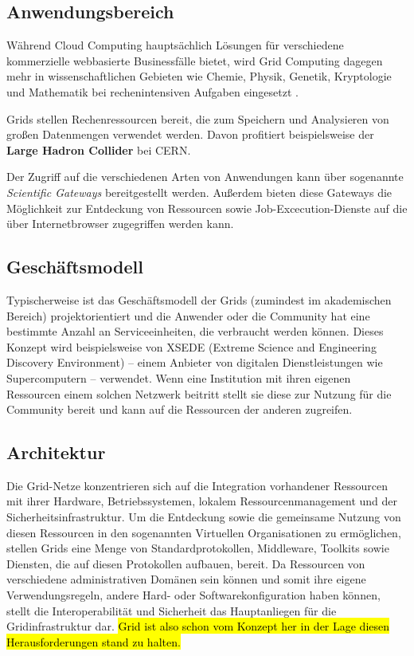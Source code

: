 \subsection{Anwendungsbereich}
Während Cloud Computing hauptsächlich Lösungen für verschiedene kommerzielle webbasierte Businessfälle bietet, wird Grid Computing dagegen mehr in wissenschaftlichen Gebieten wie Chemie, Physik, Genetik, Kryptologie und Mathematik bei rechenintensiven Aufgaben eingesetzt \cite{5623257}.

Grids stellen Rechenressourcen bereit, die zum Speichern und Analysieren von großen Datenmengen verwendet werden. Davon profitiert beispielsweise der \textbf{Large Hadron Collider} bei CERN.\cite{wlcg}

Der Zugriff auf die verschiedenen Arten von Anwendungen kann über sogenannte \textit{Scientific Gateways} bereitgestellt werden. Außerdem bieten diese Gateways die Möglichkeit zur Entdeckung von Ressourcen sowie Job-Excecution-Dienste auf die über Internetbrowser zugegriffen werden kann\cite{360-degree-compared}.

\subsection{Geschäftsmodell}
Typischerweise ist das Geschäftsmodell der Grids (zumindest im akademischen Bereich) projektorientiert und die Anwender oder die Community hat eine bestimmte Anzahl an Serviceeinheiten, die verbraucht werden können\cite{360-degree-compared}.  
Dieses Konzept wird beispielsweise von XSEDE (Extreme Science and Engineering Discovery Environment) -- einem Anbieter von digitalen Dienstleistungen wie Supercomputern -- verwendet\cite{xsede}.
Wenn eine Institution mit ihren eigenen Ressourcen einem solchen Netzwerk beitritt stellt sie diese zur Nutzung für die Community bereit und kann auf die Ressourcen der anderen zugreifen\cite{360-degree-compared}.



\subsection{Architektur}
Die Grid-Netze konzentrieren sich auf die Integration vorhandener Ressourcen mit ihrer Hardware, Betriebssystemen, lokalem Ressourcenmanagement und der Sicherheitsinfrastruktur.
Um die Entdeckung sowie die gemeinsame Nutzung von diesen Ressourcen in den sogenannten \glqq Virtuellen Organisationen\grqq{} zu ermöglichen, stellen Grids eine Menge von Standardprotokollen, Middleware, Toolkits sowie Diensten, die auf diesen Protokollen aufbauen, bereit.
Da Ressourcen von verschiedene administrativen Domänen sein können und somit ihre eigene Verwendungsregeln, andere Hard- oder Softwarekonfiguration haben können, stellt die Interoperabilität und Sicherheit das Hauptanliegen für die Gridinfrastruktur dar.\cite{360-degree-compared}
\hl{Grid ist also schon vom Konzept her in der Lage diesen Herausforderungen stand zu halten.}

